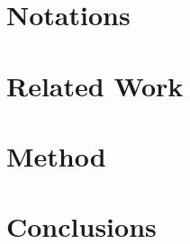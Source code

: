 \documentclass[harvard]{lincolncsthesis}
\begin{document}

\maketitle

% 

% 

% 

\thesisBodyStart



% 

\chapter{Notations}


\chapter{Related Work}


\chapter{Method}


\chapter{Conclusions}




\printReferences


\end{document}
